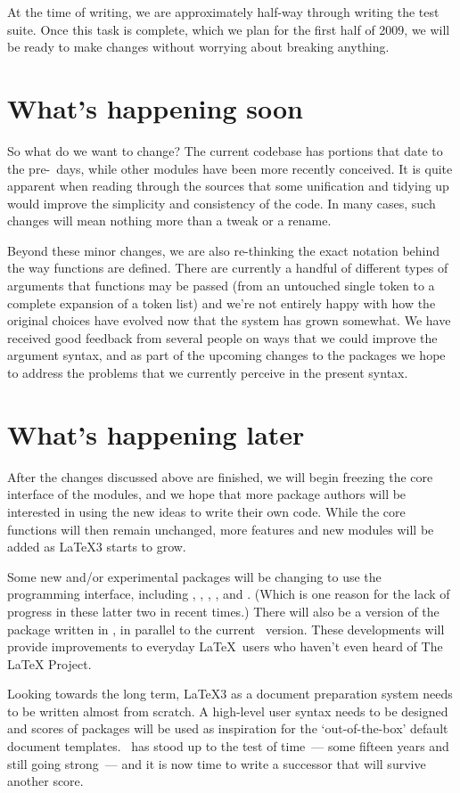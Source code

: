 \documentclass{ltnews}
\begin{document}
At the time of writing, we are approximately half-way through writing the test
suite. Once this task is complete, which we plan for the first
half of 2009, we will be ready to make changes without worrying about breaking
anything.

\section{What's happening soon}

So what do we want to change? The current  codebase has
portions that date to the pre-\LaTeXe\ days, while other modules have been
more recently conceived. It is quite apparent when reading through the sources
that some unification and tidying up would improve the simplicity and
consistency of the code. In many cases, such changes will mean nothing more
than a tweak or a rename.

Beyond these minor changes, we are also re-thinking the exact notation behind
the way functions are defined. There are currently a handful of different
types of arguments that functions may be passed (from an untouched single
token to a complete expansion of a token list) and we're not entirely happy
with how the original choices have evolved now that the system has grown
somewhat. We have received good feedback from several people on ways that we
could improve the argument syntax, and as part of the upcoming changes to the
 packages we hope to address the problems that we currently
perceive in the present syntax.

\section{What's happening later}

After the changes discussed above are finished, we will begin freezing the core
interface of the  modules, and we hope that more package
authors will be interested in using the new ideas to write their own code.
While the core functions will then remain unchanged, more features and new
modules will be added as \LaTeX3 starts to grow.

Some new and/or experimental packages will be changing to use the
 programming interface, including ,
, , , and
. (Which is one reason for the lack of progress in
these latter two in recent times.) There will also be a version of the
 package written in , in parallel to the
current \LaTeXe\ version. These developments will provide improvements to
everyday \LaTeX\ users who haven't even heard of The LaTeX{} Project.

Looking towards the long term, \LaTeX3 as a document preparation system needs
to be written almost from scratch. A high-level user syntax needs to be
designed and scores of packages will be used as inspiration for the
`out-of-the-box' default document templates. \LaTeXe\ has stood up to the test
of time~--- some fifteen years and still going strong~--- and it is now time
to write a successor that will survive another score.
\end{document}
